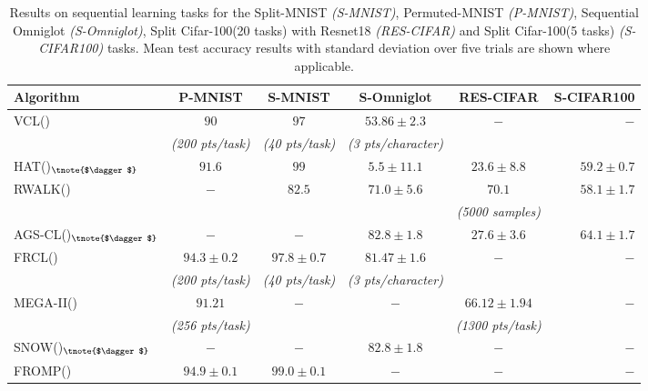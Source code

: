 \documentclass{article}
\begin{document}
\begin{table*}[t]
  \caption{Results on sequential learning tasks for the Split-MNIST \textit{(S-MNIST)}, Permuted-MNIST \textit{(P-MNIST)}, Sequential Omniglot \textit{(S-Omniglot)}, Split Cifar-100(20 tasks) with Resnet18 \textit{(RES-CIFAR)} and Split Cifar-100(5 tasks) \textit{(S-CIFAR100)} tasks. 
Mean test accuracy results with standard deviation over five trials are shown where applicable.}
  \label{sequential-baselines}
  \vskip 0.15in
  \begin{center}
  \begin{small}
  \begin{sc}
  \begin{threeparttable}
  \begin{tabular}{lccccr}
    \toprule
    Algorithm & P-MNIST & S-MNIST & S-Omniglot & RES-CIFAR & S-CIFAR100\\
    \midrule
    VCL(\cite{nguyen2017variational})\tnote{$\mathcal{R}$,$\mathcal{H}$} & $90$ & $97$ & $53.86\pm2.3$& $-$ & $-$ \\
    & \textit{(200 pts/task)} & \textit{(40 pts/task)} & \textit{(3 pts/character)}\\
    HAT(\cite{Serr2018OvercomingCF})$_{\tnote{$\dagger$}}$ \tnote{$\mathcal{H}$} & $91.6$ & $99$ & $5.5 \pm 11.1$ & $23.6\pm8.8$ & $59.2 \pm0.7$\\
    RWALK(\cite{Chaudhry_2018_ECCV})\tnote{$\mathcal{R}$,$\mathcal{H}$} & $-$ & $82.5$ & $71.0\pm5.6$ & $70.1$ & $58.1 \pm 1.7$\\
    &  & & & \textit{(5000 samples)}  \\
    AGS-CL(\cite{jung2020continual})$_{\tnote{$\dagger$}}$\tnote{$\mathcal{H}$} & $-$ & $-$ & $82.8\pm1.8$ & $27.6\pm3.6$ & $64.1 \pm 1.7$\\
    FRCL(\cite{titsias2019functional})\tnote{$\mathcal{R}$} & $94.3 \pm 0.2$ & $97.8 \pm 0.7$ & $81.47 \pm 1.6$ & $-$ & $-$ \\
     & \textit{(200 pts/task)} & \textit{(40 pts/task)} & \textit{(3 pts/character)}\\
    MEGA-II(\cite{guo2020improved})\tnote{$\mathcal{R}$,**} & $91.21$ & $-$ & $-$& $66.12\pm1.94$\tnote{$\mathcal{M}$} & $-$ \\
    & \textit{(256 pts/task)} & & & \textit{(1300 pts/task)}\\
    SNOW(\cite{yoo_snow_2020})$_{\tnote{$\dagger$}}$\tnote{a} & $-$ & $-$ & $82.8 \pm 1.8$ & $-$ & $-$ \\
    FROMP(\cite{pan2021continual})\tnote{$\mathcal{R}$} & $94.9 \pm 0.1$ & $99.0 \pm 0.1$ & $-$& $-$ & $-$ \\

\end{tabular}
\end{threeparttable}
\end{sc}
\end{small}
\end{center}
\end{table*}
\end{document}
